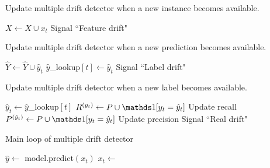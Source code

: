 \begin{algorithm}
    \caption{Update multiple drift detector when a new instance becomes available.}
    \label{alg:mdd_instance}
    \begin{algorithmic}
        \State $X\gets X\cup x_t$
          \State Signal ``Feature drift"
        \EndIf
      \EndFunction
    \end{algorithmic}
\end{algorithm}

\begin{algorithm}
    \caption{Update multiple drift detector when a new prediction becomes available.}
    \label{alg:mdd_prediction}
    \begin{algorithmic}
            \State $\hat{Y}\gets \hat{Y}\cup \hat{y}_t$
            \State $\hat{y}$\_lookup$[t] \gets \hat{y}_t$
              \State Signal ``Label drift"
            \EndIf
        \EndFunction
    \end{algorithmic}
\end{algorithm}

\begin{algorithm}
    \caption{Update multiple drift detector when a new label becomes available.}
    \label{alg:mdd_label}
    \begin{algorithmic}
            \State $\hat{y}_t \gets \hat{y}$\_lookup$[t]$
            \State $R^{(y_t)}\gets P\cup \id{y_t=\hat{y}_t}$
            \Comment Update recall
            \State $P^{(\hat{y}_t)}\gets P\cup \id{y_t=\hat{y}_t}$
            \Comment Update precision
              \State Signal ``Real drift"
            \EndIf
        \EndFunction
    \end{algorithmic}
\end{algorithm}

\begin{algorithm}
    \caption{Main loop of multiple drift detector}
    \label{alg:mdd_loop}
    \begin{algorithmic}
        \State {}
            \State $\hat{y} \gets$ model.predict$(x_t)$
            \State $x_t \gets $
            \State {}
            \State {}
            \State {}
          \EndIf
        \EndWhile
    \end{algorithmic}
\end{algorithm}

